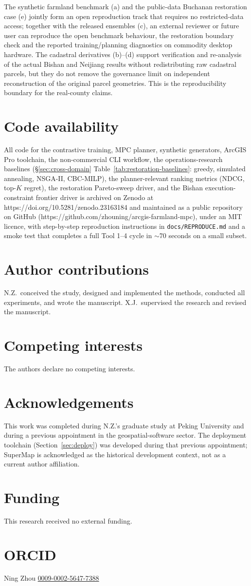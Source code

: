 \documentclass[11pt]{article}
\begin{document}
The synthetic farmland benchmark (a) and the public-data Buchanan restoration case (e) jointly form an open reproduction track that requires no restricted-data access; together with the released ensembles (c), an external reviewer or future user can reproduce the open benchmark behaviour, the restoration boundary check and the reported training/planning diagnostics on commodity desktop hardware. The cadastral derivatives (b)--(d) support verification and re-analysis of the actual Bishan and Neijiang results without redistributing raw cadastral parcels, but they do not remove the governance limit on independent reconstruction of the original parcel geometries. This is the reproducibility boundary for the real-county claims.

\section*{Code availability}
All code for the contrastive training, MPC planner, synthetic generators, ArcGIS Pro toolchain, the non-commercial CLI workflow, the operations-research baselines (\S\ref{sec:cross-domain} Table~\ref{tab:restoration-baselines}: greedy, simulated annealing, NSGA-II, CBC-MILP), the planner-relevant ranking metrics (NDCG, top-$K$ regret), the restoration Pareto-sweep driver, and the Bishan execution-constraint frontier driver is archived on Zenodo at https://doi.org/10.5281/zenodo.23163184 and maintained as a public repository on GitHub (https://github.com/zhouning/arcgis-farmland-mpc), under an MIT licence, with step-by-step reproduction instructions in \texttt{docs/REPRODUCE.md} and a smoke test that completes a full Tool 1--4 cycle in $\sim$70 seconds on a small subset.

\section*{Author contributions}
N.Z.\ conceived the study, designed and implemented the methods, conducted all experiments, and wrote the manuscript. X.J.\ supervised the research and revised the manuscript.

\section*{Competing interests}
The authors declare no competing interests.



\section*{Acknowledgements}
This work was completed during N.Z.'s graduate study at Peking University and during a previous appointment in the geospatial-software sector. The deployment toolchain (Section~\ref{sec:deploy}) was developed during that previous appointment; SuperMap is acknowledged as the historical development context, not as a current author affiliation.

\section*{Funding}
This research received no external funding.

\section*{ORCID}
Ning Zhou \href{https://orcid.org/0009-0002-5647-7388}{0009-0002-5647-7388}
\end{document}
